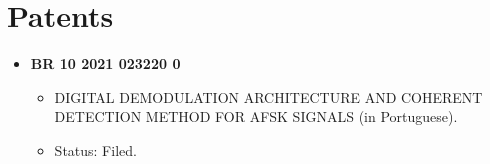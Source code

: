 \section{Patents}
\begin{itemize}[leftmargin=0.15in, label={}] %
    \item \textbf{BR 10 2021 023220 0}
    \begin{itemize}
        \item DIGITAL DEMODULATION ARCHITECTURE AND COHERENT DETECTION METHOD FOR AFSK SIGNALS (in Portuguese).
        \item Status: Filed.
    \end{itemize}
\end{itemize}